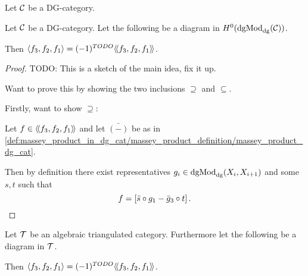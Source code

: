 \begin{lemma}
    Let \( {\mathcal{C}} \) be a DG-category.
\end{lemma}

\begin{theorem}
    Let \( {\mathcal{C}} \) be a DG-category. Let the following be a diagram in \( H^0(\operatorname{dgMod}_{\operatorname{dg}}({\mathcal{C}})) \).
    \begin{center}
    \end{center}
    Then \( \langle f_3, f_2, f_1 \rangle = (-1)^{TODO} \langle \! \langle f_3, f_2, f_1 \rangle \! \rangle \).
\end{theorem}
\begin{proof}
    TODO: This is a sketch of the main idea, fix it up.

    Want to prove this by showing the two inclusions \( \supseteq \) and \( \subseteq \).

    Firstly, want to show \( \supseteq \):

    Let \( f \in \langle \! \langle f_3, f_2, f_1 \rangle \! \rangle \) and let \( \bar{(-)} \) be as in \autoref{def:massey_product_in_dg_cat/massey_product_definition/massey_product_dg_cat}.
    
    Then by definition there exist representatives \( g_i \in \operatorname{dgMod}_{\operatorname{dg}}(X_i, X_{i + 1}) \) and some \( s, t \) such that
    \[
        f = \left[ \bar{s} \circ g_1 - \bar{g}_3 \circ t \right].
    \]
\end{proof}

\begin{corollary}
    Let \( {\mathcal{T}} \) be an algebraic triangulated category. Furthermore let the following be a diagram in \( {\mathcal{T}} \).
    \begin{center}
    \end{center}
    Then \( \langle f_3, f_2, f_1 \rangle = (-1)^{TODO} \langle \! \langle f_3, f_2, f_1 \rangle \! \rangle \).
\end{corollary}
